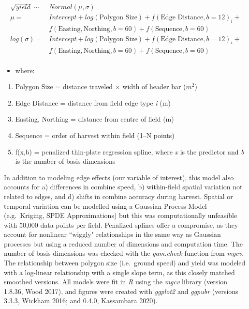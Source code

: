 \documentclass[]{elsarticle} %
\providecommand{\tightlist}{%
  \setlength{\itemsep}{0pt}\setlength{\parskip}{0pt}}
\begin{document}
\begin{equation}
  \begin{split}
  \sqrt{yield} \sim & Normal (\mu, \sigma)\\
  \mu = & Intercept + log(\text{Polygon Size}) + f(\text{Edge Distance}, b=12)_i + \\
   & f(\text{Easting}, \text{Northing}, b=60) + f(\text{Sequence}, b=60) \\
  log(\sigma) =  & Intercept + log(\text{Polygon Size}) + f(\text{Edge Distance}, b=12)_i + \\
   & f(\text{Easting}, \text{Northing}, b=60) + f(\text{Sequence}, b=60) \\
  \end{split}
  \end{equation}

\begin{itemize}
\tightlist
\item
  where:
\end{itemize}

\begin{enumerate}
\def\labelenumi{\arabic{enumi}.}
\tightlist
\item
  Polygon Size = distance traveled \(\times\) width of header bar (\(m^2\))
\item
  Edge Distance = distance from field edge type \emph{i} (m)
\item
  Easting, Northing = distance from centre of field (m)
\item
  Sequence = order of harvest within field (1--N points)
\item
  f(x,b) = penalized thin-plate regression spline, where \emph{x} is the predictor and \emph{b} is the number of basis dimensions
\end{enumerate}

In addition to modeling edge effects (our variable of interest), this model also accounts for a) differences in combine speed, b) within-field spatial variation not related to edges, and d) shifts in combine accuracy during harvest.
Spatial or temporal variation can be modelled using a Gaussian Process Model (e.g.~Kriging, SPDE Approximations) but this was computationally unfeasible with 50,000 data points per field.
Penalized splines offer a compromise, as they account for nonlinear ``wiggly" relationships in the same way as Gaussian processes but using a reduced number of dimensions and computation time.
The number of basis dimensions was checked with the \emph{gam.check} function from \emph{mgcv}.
The relationship between polygon size (i.e.~ground speed) and yield was modeled with a log-linear relationship with a single slope term, as this closely matched smoothed versions.
All models were fit in \emph{R} using the \emph{mgcv} library (version 1.8.36, Wood 2017), and figures were created with \emph{ggplot2} and \emph{ggpubr} (versions 3.3.3, Wickham 2016; and 0.4.0, Kassambara 2020).
\end{document}
